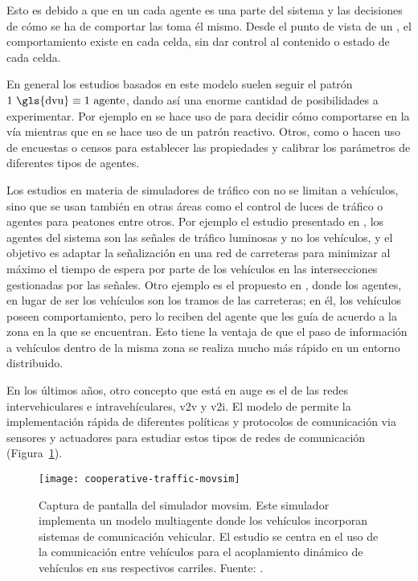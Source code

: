 Esto es debido a que en un  cada agente es una parte del sistema y las decisiones de cómo se ha de comportar las toma él mismo. Desde el punto de vista de un , el comportamiento existe en cada celda, sin dar control al contenido o estado de cada celda.

En general los estudios basados en este modelo suelen seguir el patrón $1 \text{ \gls{dvu}\index{driver-vehicle unit}} \equiv 1 \text{ agente}$, dando así una enorme cantidad de posibilidades a experimentar. Por ejemplo en \cite{Das} se hace uso de  para decidir cómo comportarse en la vía mientras que en \cite{Ehlert2001} se hace uso de un patrón reactivo. Otros, como \cite{Dia2002} o \cite{Balmer} hacen uso de encuestas o censos para establecer las propiedades y calibrar los parámetros de diferentes tipos de agentes.

Los estudios en materia de simuladores de tráfico con  no se limitan a vehículos, sino que se usan también en otras áreas como el control de luces de tráfico o agentes para peatones entre otros. Por ejemplo el estudio presentado en \cite{Clymer2002}, los agentes del sistema son las señales de tráfico luminosas y no los vehículos, y el objetivo es adaptar la señalización en una red de carreteras para minimizar al máximo el tiempo de espera por parte de los vehículos en las intersecciones gestionadas por las señales. Otro ejemplo es el propuesto en \cite{Galis2000}, donde los agentes, en lugar de ser los vehículos son los tramos de las carreteras; en él, los vehículos poseen comportamiento, pero lo reciben del agente que les guía de acuerdo a la zona en la que se encuentran. Esto tiene la ventaja de que el paso de información a vehículos dentro de la misma zona se realiza mucho más rápido en un entorno distribuido.

En los últimos años, otro concepto que está en auge es el de las redes intervehiculares e intravehículares, \gls{v2v} y \gls{v2i}. El modelo de  permite la implementación rápida de diferentes políticas y protocolos de comunicación via sensores y actuadores para estudiar estos tipos de redes de comunicación (Figura~\ref{fig:cooperative-traffic-movsim}).

\begin{figure}
	\centering
	\texttt{[image: cooperative-traffic-movsim]}
	\caption[Captura de pantalla del simulador \gls{movsim}]{Captura de pantalla del simulador \gls{movsim}. Este simulador implementa un modelo multiagente donde los vehículos incorporan sistemas de comunicación vehicular. El estudio se centra en el uso de la comunicación entre vehículos para el acoplamiento dinámico de vehículos en sus respectivos carriles. Fuente: \cite{Gu2015}.}
	\label{fig:cooperative-traffic-movsim}
\end{figure}

